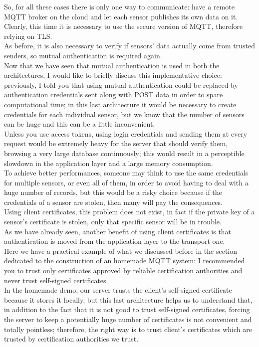\documentclass[12pt]{report}
\begin{document}
{So, for all these cases there is only one way to communicate: have a remote MQTT broker on the cloud and let each sensor publishes its own data on it.\\
Clearly, this time it is necessary to use the secure version of MQTT, therefore relying on TLS.\\
As before, it is also necessary to verify if sensors' data actually come from trusted senders, so mutual authentication is required again.\\

Now that we have seen that mutual authentication is used in both the architectures, I would like to briefly discuss this implementative choice: previously, I told you that using mutual authentication could be replaced by authentication credentials sent along with POST data in order to spare computational time; in this last architecture it would be necessary to create credentials for each individual sensor, but we know that the number of sensors can be huge and this can be a little inconvenient.\\
Unless you use access tokens, using login credentials and sending them at every request would be extremely heavy for the server that should verify them, browsing a very large database continuously; this would result in a perceptible slowdown in the application layer and a large memory consumption.\\
To achieve better performances, someone may think to use the same credentials for multiple sensors, or even all of them, in order to avoid having to deal with a huge number of records, but this would be a risky choice because if the credentials of a sensor are stolen, then many will pay the consequences.\\
Using client certificates, this problem does not exist, in fact if the private key of a sensor's certificate is stolen, only that specific sensor will be in trouble.\\
As we have already seen, another benefit of using client certificates is that authentication is moved from the application layer to the transport one.\\

Here we have a practical example of what we discussed before in the section dedicated to the construction of an homemade MQTT system: I recommended you to trust only certificates approved by reliable certification authorities and never trust self-signed certificates. \\
In the homemade demo, our server trusts the client's self-signed certificate because it stores it locally, but this last architecture helps us to understand that, in addition to the fact that it is not good to trust self-signed certificates, forcing the server to keep a potentially huge number of certificates is not convenient and totally pointless; therefore, the right way is to trust client's certificates which are trusted by certification authorities we trust.\\

}
\end{document}
